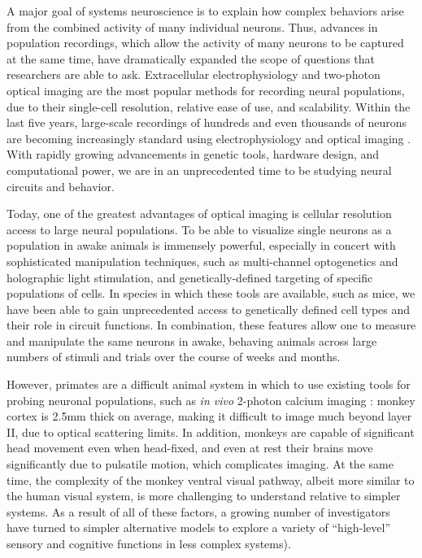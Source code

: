 A major goal of systems neuroscience is to explain how complex behaviors arise from the combined activity of many individual neurons. Thus, advances in population recordings, which allow the activity of many neurons to be captured at the same time, have dramatically expanded the scope of questions that researchers are able to ask. Extracellular electrophysiology and two-photon optical imaging are the most popular methods for recording neural populations, due to their single-cell resolution, relative ease of use, and scalability. Within the last five years, large-scale recordings of hundreds and even thousands of neurons are becoming increasingly standard using electrophysiology \cite{Steinmetz2019, Siegle2021} and optical imaging \cite{Stringer2019a, Weisenburger2019, Sofroniew2016}. With rapidly growing advancements in genetic tools, hardware design, and computational power, we are in an unprecedented time to be studying neural circuits and behavior. 

Today, one of the greatest advantages of optical imaging is cellular resolution access to large neural populations. To be able to visualize single neurons as a population in awake animals is immensely powerful, especially in concert with sophisticated manipulation techniques, such as multi-channel optogenetics and holographic light stimulation\cite{Gill2020PreciseDetection}, and genetically-defined targeting of specific populations of cells. In species in which these tools are available, such as mice, we have been able to gain unprecedented access to genetically defined cell types and their role in circuit functions\cite{Luo2008, Luo2018, HubermanNiell2011}. In combination, these features allow one to measure and manipulate the same neurons in awake, behaving animals across large numbers of stimuli and trials over the course of weeks and months. 


However, primates are a difficult animal system in which to use existing tools for probing neuronal populations, such as \textit{in vivo} 2-photon calcium imaging \cite{Ohki2005}: monkey cortex is 2.5mm thick on average\cite{Koo2012Age-relatedBrain}, making it difficult to image much beyond layer II, due to optical scattering limits. In addition, monkeys are capable of significant head movement even when head-fixed, and even at rest their brains move significantly due to pulsatile motion, which complicates imaging. At the same time, the complexity of the monkey ventral visual pathway, albeit more similar to the human visual system, is more challenging to understand relative to simpler systems. As a result of all of these factors, a growing number of investigators have turned to simpler alternative models to explore a variety of ``high-level'' sensory and cognitive functions in less complex systems\cite{Brunton2013RatsFrom, Miller2017TwoStep, Aronov2014, Glickfeld2017, HubermanNiell2011}).

